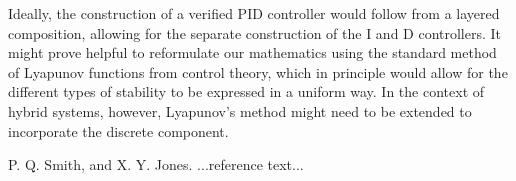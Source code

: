 \documentclass[preprint]{sigplanconf}
\begin{document}
Ideally, the construction of a verified PID controller would follow from a layered composition, allowing for the separate construction of the I and D controllers. It might prove helpful to reformulate our mathematics using the standard method of Lyapunov functions from control theory, which in principle would allow for the different types of stability to be expressed in a uniform way. In the context of hybrid systems, however, Lyapunov's method might need to be extended to incorporate the discrete component.


















\begin{thebibliography}{}
\softraggedright
P. Q. Smith, and X. Y. Jones. ...reference text...

\end{thebibliography}
\end{document}
